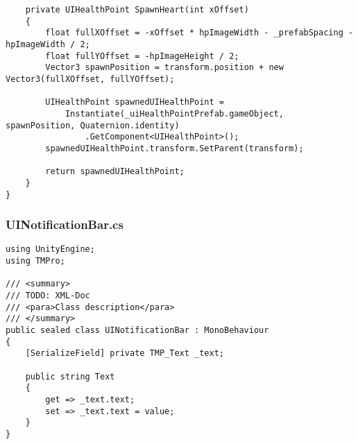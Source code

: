 \begin{verbatim}
    private UIHealthPoint SpawnHeart(int xOffset)
    {
        float fullXOffset = -xOffset * hpImageWidth - _prefabSpacing - hpImageWidth / 2;
        float fullYOffset = -hpImageHeight / 2;
        Vector3 spawnPosition = transform.position + new Vector3(fullXOffset, fullYOffset);

        UIHealthPoint spawnedUIHealthPoint =
            Instantiate(_uiHealthPointPrefab.gameObject, spawnPosition, Quaternion.identity)
                .GetComponent<UIHealthPoint>();
        spawnedUIHealthPoint.transform.SetParent(transform);

        return spawnedUIHealthPoint;
    }
}
\end{verbatim}
\subsubsection*{UINotificationBar.cs}
\begin{verbatim}
using UnityEngine;
using TMPro;

/// <summary>
/// TODO: XML-Doc
/// <para>Class description</para>
/// </summary>
public sealed class UINotificationBar : MonoBehaviour
{
    [SerializeField] private TMP_Text _text;

    public string Text
    {
        get => _text.text;
        set => _text.text = value;
    }
}
\end{verbatim}
